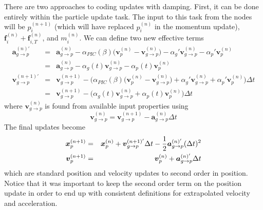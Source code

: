 \documentclass[11pt]{article}
\renewcommand{\vec}[1]{\boldsymbol{#1}}
\begin{document}
There are two approaches to coding updates with damping. First, it can be done entirely within the particle update task. The input to this task from  the nodes will be $p_i^{(n+1)}$ (which will have replaced $p_i^{(n)}$ in the momentum update), $ \vec f_{i}^{(n)} + \vec f_{i,T}^{(n)}$, and  $m_i^{(n)}$. We can define two new effective terms
\begin{eqnarray}
    \vec{a}_{g\to p}^{(n)'} & = &  \vec{a}_{g\to p}^{(n)} - \alpha_{PIC}(\beta)\bigl(\vec v_p^{(n)}-\vec v_{g\to p}^{(n)}\bigr)
         -  \alpha_g'\vec{v}_{g\to p}^{(n)} -  \alpha_p'\vec{v}_p^{(n)} \\
         & = & \vec{a}_{g\to p}^{(n)} -  \alpha_g(t)\vec{v}_{g\to p}^{(n)} -  \alpha_p(t)\vec{v}_p^{(n)}  \\
    \vec v_{g\to p}^{(n+1)'} & = & \vec v_{g\to p}^{(n+1)} - \biggl(\alpha_{PIC}(\beta)\bigl(\vec v_p^{(n)}-\vec v_{g\to p}^{(n)}\bigr)
         +  \alpha_g'\vec{v}_{g\to p}^{(n)} + \alpha_p'\vec{v}_p^{(n)}\biggr)\Delta t \\
         & = & \vec v_{g\to p}^{(n+1)} - \biggl( \alpha_g(t)\vec{v}_{g\to p}^{(n)} + \alpha_p(t)\vec{v}_p^{(n)}\biggr)\Delta t
\end{eqnarray}
where $\vec v_{g\to p}^{(n)}$ is found from available input properties using
\begin{equation}
 \vec v_{g\to p}^{(n)}  =  \vec v_{g\to p}^{(n+1)}  - \vec{a}_{g\to p}^{(n)}\Delta t
\end{equation}
The final updates become
\begin{eqnarray}
   \vec{x}_{p}^{(n+1)} & = & \vec{x}_p^{(n)} +\vec v_{g\to p}^{(n+1)'}\Delta t - {1\over 2}\vec{a}_{g\to p}^{(n)'}(\Delta t)^2  \\
   \vec{v}_{p}^{(n+1)} & = & \vec{v}_p^{(n)} + \vec{a}_{g\to p}^{(n)'}\Delta t 
\end{eqnarray}
which are standard position and velocity updates to second order in position. Notice that it was important to keep the second order term on the position update in order to end up with consistent definitions for extrapolated velocity and acceleration.
\end{document}
